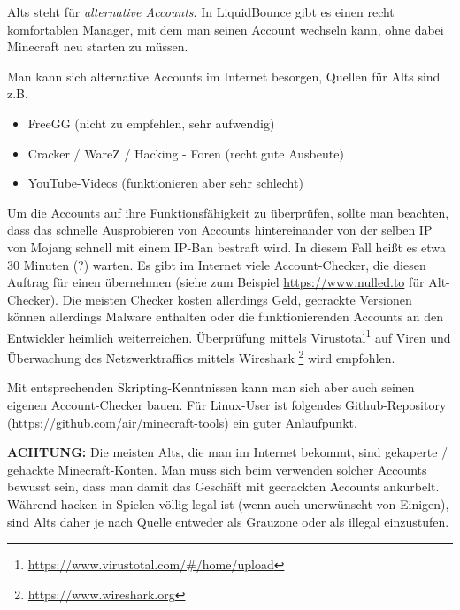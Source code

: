 Alts steht für \textit{alternative Accounts}. In LiquidBounce gibt es einen recht komfortablen Manager, mit dem man seinen Account wechseln kann, ohne dabei Minecraft neu starten zu müssen.

Man kann sich alternative Accounts im Internet besorgen, Quellen für Alts sind z.B.
\begin{itemize}
    \item FreeGG (nicht zu empfehlen, sehr aufwendig)
    \item Cracker / WareZ / Hacking - Foren (recht gute Ausbeute)
    \item YouTube-Videos (funktionieren aber sehr schlecht)
\end{itemize}

Um die Accounts auf ihre Funktionsfähigkeit zu überprüfen, sollte man beachten, dass das schnelle Ausprobieren von Accounts hintereinander von der selben IP von Mojang schnell mit einem IP-Ban bestraft wird. In diesem Fall heißt es etwa 30 Minuten (?) warten. Es gibt im Internet viele Account-Checker, die diesen Auftrag für einen übernehmen (siehe zum Beispiel \url{https://www.nulled.to} für Alt-Checker). Die meisten Checker kosten allerdings Geld, gecrackte Versionen können allerdings Malware enthalten oder die funktionierenden Accounts an den Entwickler heimlich weiterreichen. Überprüfung mittels Virustotal\footnote{\url{https://www.virustotal.com/\#/home/upload}} auf Viren und Überwachung des Netzwerktraffics mittels Wireshark \footnote{\url{https://www.wireshark.org}} wird empfohlen.

Mit entsprechenden Skripting-Kenntnissen kann man sich aber auch seinen eigenen Account-Checker bauen. Für Linux-User ist folgendes Github-Repository (\url{https://github.com/air/minecraft-tools}) ein guter Anlaufpunkt.

\textbf{ACHTUNG:} Die meisten Alts, die man im Internet bekommt, sind gekaperte / gehackte Minecraft-Konten. Man muss sich beim verwenden solcher Accounts bewusst sein, dass man damit das Geschäft mit gecrackten Accounts ankurbelt. Während hacken in Spielen völlig legal ist (wenn auch unerwünscht von Einigen), sind Alts daher je nach Quelle entweder als Grauzone oder als illegal einzustufen.